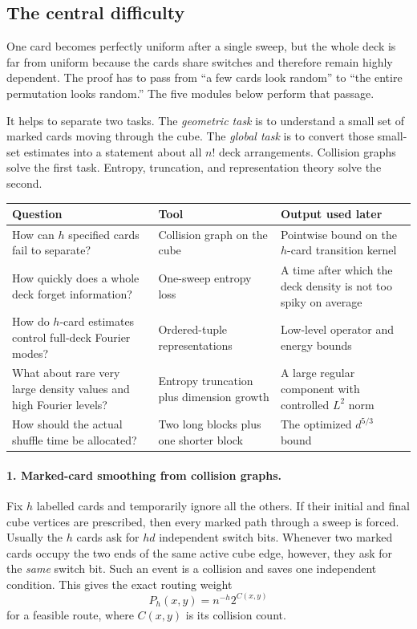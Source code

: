 \documentclass[11pt]{article}
\numberwithin{equation}{section}
\theoremstyle{definition}\newtheorem{definition}[theorem]{Definition}
\theoremstyle{remark}\newtheorem{remark}[theorem]{Remark}
\begin{document}
\subsection*{The central difficulty}
One card becomes perfectly uniform after a single sweep, but the whole deck is
far from uniform because the cards share switches and therefore remain highly
dependent.  The proof has to pass from ``a few cards look random'' to ``the
entire permutation looks random.''  The five modules below perform that
passage.

It helps to separate two tasks.  The \emph{geometric task} is to understand a
small set of marked cards moving through the cube.  The \emph{global task} is
to convert those small-set estimates into a statement about all $n!$ deck
arrangements.  Collision graphs solve the first task.  Entropy, truncation,
and representation theory solve the second.

\begin{center}
\begin{tabular}{p{}p{}p{}}
\toprule
Question & Tool & Output used later \\
\midrule
How can $h$ specified cards fail to separate? & Collision graph on the cube & Pointwise bound on the $h$-card transition kernel \\
How quickly does a whole deck forget information? & One-sweep entropy loss & A time after which the deck density is not too spiky on average \\
How do $h$-card estimates control full-deck Fourier modes? & Ordered-tuple representations & Low-level operator and energy bounds \\
What about rare very large density values and high Fourier levels? & Entropy truncation plus dimension growth & A large regular component with controlled $L^2$ norm \\
How should the actual shuffle time be allocated? & Two long blocks plus one shorter block & The optimized $d^{5/3}$ bound \\
\bottomrule
\end{tabular}
\end{center}

\paragraph{1. Marked-card smoothing from collision graphs.}
Fix $h$ labelled cards and temporarily ignore all the others.  If their
initial and final cube vertices are prescribed, then every marked path through
a sweep is forced.  Usually the $h$ cards ask for $hd$ independent switch
bits.  Whenever two marked cards occupy the two ends of the same active cube
edge, however, they ask for the \emph{same} switch bit.  Such an event is a
collision and saves one independent condition.  This gives the exact routing
weight
\[
 P_h(x,y)=n^{-h}2^{C(x,y)}
\]
for a feasible route, where $C(x,y)$ is its collision count.
\end{document}
